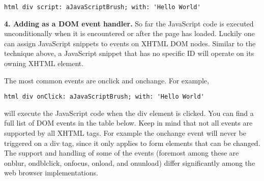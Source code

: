 \documentclass[a4paper,10pt,twoside]{book}
\newcommand{\ct}[1]{{\small\ttfamily\textup{#1}}}
\begin{document}
\begin{lstlisting}
html div script: aJavaScriptBrush; with: 'Hello World'
\end{lstlisting}

\textbf{4. Adding as a DOM event handler.} So far the JavaScript code is executed unconditionally when it is encountered or after the page has loaded. Luckily one can assign JavaScript snippets to events on XHTML DOM nodes. Similar to the technique above, a JavaScript snippet that has no specific ID will operate on its owning XHTML element.

The most common events are \ct{onclick} and \ct{onchange}. For example,

\begin{lstlisting}
html div onClick: aJavaScriptBrush; with: 'Hello World'
\end{lstlisting}

will execute the JavaScript code when the div element is clicked. You can find a full list of DOM events in the table below. Keep in mind that not all events are supported by all XHTML tags. For example the \ct{onchange} event will never be triggered on a div tag, since it only applies to form elements that can be changed. The support and handling of some of the events (foremost among these are \ct{onblur}, \ct{ondblclick}, \ct{onfocus}, \ct{onload}, and \ct{onunload}) differ significantly among the web browser implementations.

\end{document}
